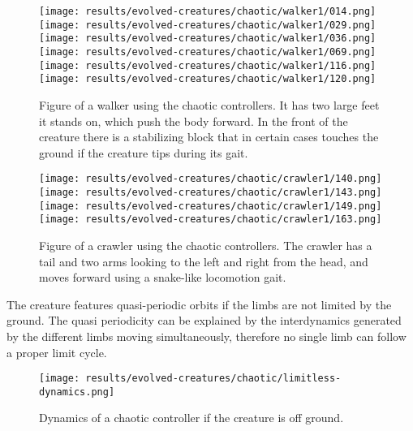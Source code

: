 \documentclass[main]{subfiles}
\begin{document}
\begin{figure}[H]
\centering
\texttt{[image: results/evolved-creatures/chaotic/walker1/014.png]}
\texttt{[image: results/evolved-creatures/chaotic/walker1/029.png]}
\texttt{[image: results/evolved-creatures/chaotic/walker1/036.png]}
\texttt{[image: results/evolved-creatures/chaotic/walker1/069.png]}
\texttt{[image: results/evolved-creatures/chaotic/walker1/116.png]}
\texttt{[image: results/evolved-creatures/chaotic/walker1/120.png]}
\caption[Figure of a walker using chaotic controllers.]{Figure of a walker using the chaotic controllers. It has two large feet it stands on, which push the body forward. In the front of the creature there is a stabilizing block that in certain cases touches the ground if the creature tips during its gait.}
\label{figure:successfulcreatures-chaotic-walker1}
\end{figure}

\begin{figure}[H]
\centering
\texttt{[image: results/evolved-creatures/chaotic/crawler1/140.png]}
\texttt{[image: results/evolved-creatures/chaotic/crawler1/143.png]}
\texttt{[image: results/evolved-creatures/chaotic/crawler1/149.png]}
\texttt{[image: results/evolved-creatures/chaotic/crawler1/163.png]}
\caption[Figure of a crawler using chaotic controllers.]{Figure of a crawler using the chaotic controllers. The crawler has a tail and two arms looking to the left and right from the head, and moves forward using a snake-like locomotion gait.}
\label{figure:successfulcreatures-chaotic-crawler1}
\end{figure}

The creature features quasi-periodic orbits if the limbs are not limited by the ground. %
%
The quasi periodicity can be explained by the interdynamics generated by the different limbs moving simultaneously, therefore no single limb can follow a proper limit cycle. %

\begin{figure}[H]
\centering
\texttt{[image: results/evolved-creatures/chaotic/limitless-dynamics.png]}
\caption[Off ground controller dynamics]{Dynamics of a chaotic controller if the creature is off ground.}
\label{figure:walker1-off-ground-controller-dynamics}
\end{figure}
\end{document}
